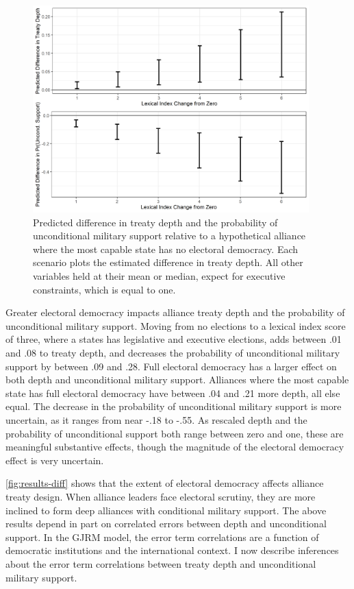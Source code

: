 \documentclass[12pt]{article}
\begin{document}
\begin{figure}[hbtp]
\centering
\includegraphics[width=0.95\textwidth]{../figures/results-diff.png}
\caption{Predicted difference in treaty depth and the probability of unconditional military support relative to a hypothetical alliance where the most capable state has no electoral democracy. Each scenario plots the estimated difference in treaty depth. All other variables held at their mean or median, expect for executive constraints, which is equal to one.}
\label{fig:results-diff}
\end{figure}


Greater electoral democracy impacts alliance treaty depth and the probability of unconditional military support. 
Moving from no elections to a lexical index score of three, where a states has legislative and executive elections, adds between .01 and .08 to treaty depth, and decreases the probability of unconditional military support by between .09 and .28.
Full electoral democracy has a larger effect on both depth and unconditional military support. 
Alliances where the most capable state has full electoral democracy have between .04 and .21 more depth, all else equal. 
The decrease in the probability of unconditional military support is more uncertain, as it ranges from near -.18 to -.55. 
As rescaled depth and the probability of unconditional support both range between zero and one, these are meaningful substantive effects, though the magnitude of the electoral democracy effect is very uncertain. 


\autoref{fig:results-diff} shows that the extent of electoral democracy affects alliance treaty design.
When alliance leaders face electoral scrutiny, they are more inclined to form deep alliances with conditional military support. 
The above results depend in part on correlated errors between depth and unconditional support. 
In the GJRM model, the error term correlations are a function of democratic institutions and the international context. 
I now describe inferences about the error term correlations between treaty depth and unconditional military support. 
\end{document}
